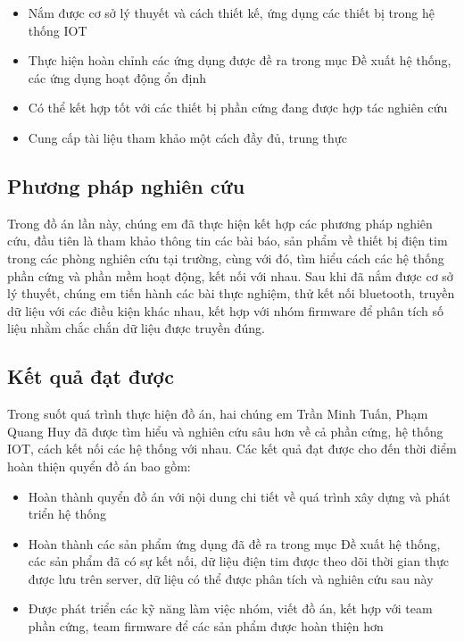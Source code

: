 \begin{adjustwidth}{1.5em}{}
  \begin{itemize}
      \item Nắm được cơ sở lý thuyết và cách thiết kế, ứng dụng các thiết bị trong hệ thống IOT
      \item Thực hiện hoàn chỉnh các ứng dụng được đề ra trong mục Đề xuất hệ thống, các ứng dụng hoạt động ổn định
      \item Có thể kết hợp tốt với các thiết bị phần cứng đang được hợp tác nghiên cứu
      \item Cung cấp tài liệu tham khảo một cách đầy đủ, trung thực

  \end{itemize}
  \end{adjustwidth}





\subsection*{Phương pháp nghiên cứu}
Trong đồ án lần này, chúng em đã thực hiện kết hợp các phương pháp nghiên cứu, đầu tiên là tham khảo thông tin các bài
báo, sản phẩm về thiết bị điện tim trong các phòng nghiên cứu tại trường, cùng với đó, tìm hiểu cách các hệ thống phần cứng và phần mềm hoạt động,
kết nối với nhau. Sau khi đã nắm được cơ sở lý thuyết, chúng em tiến hành các bài thực nghiệm, thử kết nối bluetooth, truyền dữ liệu với các điều kiện khác nhau,
kết hợp với nhóm firmware để phân tích số liệu nhằm chắc chắn dữ liệu được truyền đúng.

\subsection*{Kết quả đạt được}

Trong suốt quá trình thực hiện đồ án, hai chúng em Trần Minh Tuấn, Phạm Quang Huy đã được tìm hiểu và nghiên cứu sâu hơn về cả phần cứng,
hệ thống IOT, cách kết nối các hệ thống với nhau. Các kết quả đạt được cho đến thời điểm hoàn thiện quyển đồ án bao gồm:

\begin{adjustwidth}{1.5em}{}
  \begin{itemize}
      \item Hoàn thành quyển đồ án với nội dung chi tiết về quá trình xây dựng và phát triển hệ thống
      \item Hoàn thành các sản phẩm ứng dụng đã đề ra trong mục Đề xuất hệ thống, các sản phẩm đã có sự kết nối, dữ liệu điện tim được theo dõi
      thời gian thực được lưu trên server, dữ liệu có thể được phân tích và nghiên cứu sau này
      \item Được phát triển các kỹ năng làm việc nhóm, viết đồ án, kết hợp với team phần cứng, team firmware để các sản phẩm được hoàn thiện hơn
    \end{itemize}
  \end{adjustwidth}
